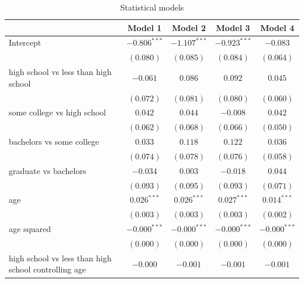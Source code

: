 \documentclass[
  12pt,
  letterpaper,
]{article}
\begin{document}
\begin{table}
\caption{Statistical models}
\begin{center}
\begin{tabular}{l c c c c}
\hline
 & Model 1 & Model 2 & Model 3 & Model 4 \\
\hline
Intercept                                            & $-0.806^{***}$ & $-1.107^{***}$ & $-0.923^{***}$ & $-0.083$       \\
                                                     & $(0.080)$      & $(0.085)$      & $(0.084)$      & $(0.064)$      \\
high school vs less than high school                 & $-0.061$       & $0.086$        & $0.092$        & $0.045$        \\
                                                     & $(0.072)$      & $(0.081)$      & $(0.080)$      & $(0.060)$      \\
some college vs high school                          & $0.042$        & $0.044$        & $-0.008$       & $0.042$        \\
                                                     & $(0.062)$      & $(0.068)$      & $(0.066)$      & $(0.050)$      \\
bachelors vs some college                            & $0.033$        & $0.118$        & $0.122$        & $0.036$        \\
                                                     & $(0.074)$      & $(0.078)$      & $(0.076)$      & $(0.058)$      \\
graduate vs bachelors                                & $-0.034$       & $0.003$        & $-0.018$       & $0.044$        \\
                                                     & $(0.093)$      & $(0.095)$      & $(0.093)$      & $(0.071)$      \\
age                                                  & $0.026^{***}$  & $0.026^{***}$  & $0.027^{***}$  & $0.014^{***}$  \\
                                                     & $(0.003)$      & $(0.003)$      & $(0.003)$      & $(0.002)$      \\
age squared                                          & $-0.000^{***}$ & $-0.000^{***}$ & $-0.000^{***}$ & $-0.000^{***}$ \\
                                                     & $(0.000)$      & $(0.000)$      & $(0.000)$      & $(0.000)$      \\
high school vs less than high school controlling age & $-0.000$       & $-0.001$       & $-0.001$       & $-0.001$       \\

\end{tabular}
\end{center}
\end{table}
\end{document}

